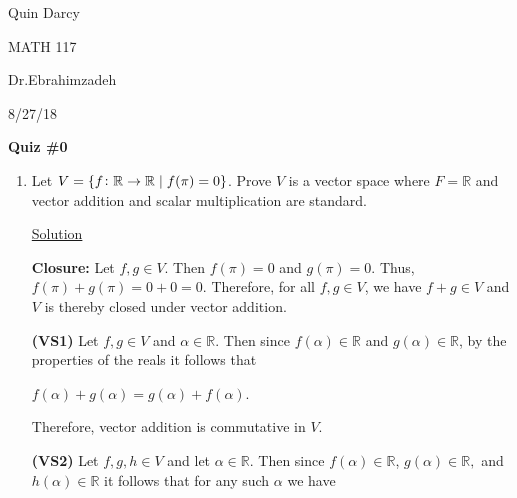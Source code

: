 \documentclass[12pt, a4paper]{article}
\begin{document}
Quin Darcy\par
MATH 117\par
Dr.Ebrahimzadeh\par
8/27/18\par

\vspace{4mm}

\centerline{\textbf{Quiz \#0}}

\vspace{4mm}

\begin{enumerate}
    \item Let $V=\{f\colon\mathbb{R}\rightarrow\mathbb{R}\hspace{1mm}|\hspace{1mm}f(\pi)=0\}$. Prove $V$ is a vector space where $F=\mathbb{R}$ and vector addition and scalar multiplication are standard.\par
    
    \vspace{4mm}
    
    \underline{Solution}\par

    \vspace{4mm}
    
    \textbf{Closure: }Let $f,g\in V$. Then $f(\pi)=0$ and $g(\pi)=0$. Thus, $f(\pi)+g(\pi)= 0 + 0 = 0$. Therefore, for all $f,g\in V$, we have $f+g\in V$ and $V$ is thereby closed under vector addition.
    
    \vspace{4mm}
    
    \textbf{(VS1) }Let $f,g\in V$ and $\alpha\in\mathbb{R}$. Then since $f(\alpha)\in\mathbb{R}$ and $g(\alpha)\in\mathbb{R}$, by the properties of the reals it follows that\par
    
    \vspace{2mm}
    
    \centerline{$f(\alpha)+g(\alpha)=g(\alpha)+f(\alpha)$.}
    
    \vspace{2mm}
    
    Therefore, vector addition is commutative in $V$.
    
    \vspace{4mm}

    \textbf{(VS2) }Let $f,g,h\in V$ and let $\alpha\in\mathbb{R}$. Then since $f(\alpha)\in\mathbb{R}$, $g(\alpha)\in\mathbb{R},$ and $h(\alpha)\in\mathbb{R}$ it follows that for any such $\alpha$ we have\par
    

\end{enumerate}
\end{document}
